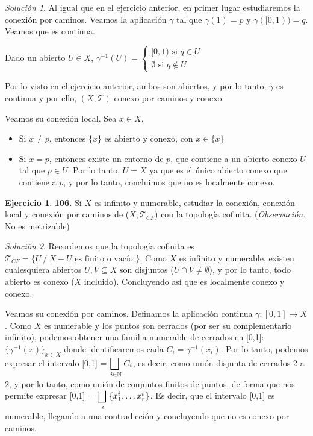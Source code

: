 \documentclass[12pt,twoside]{report}
\newcommand\mc[1]{\mathcal{#1}}
\theoremstyle{azul}
\theoremstyle{azul2}
\theoremstyle{plain}
\theoremstyle{definition}
\newtheorem*{ejern}{Ejercicio}
\theoremstyle{remark}
\newtheorem*{sol}{Solución}
\begin{document}
\begin{sol}
Al igual que en el ejercicio anterior, en primer lugar estudiaremos la conexión por caminos. Veamos la aplicación $\gamma$ tal que $\gamma(1)=p$ y $\gamma([0,1)) = q$. Veamos que es continua.

Dado un abierto $U \in X$, $\gamma^{-1}(U)=\left\{ \begin{array}{l}
     [ 0 , 1 )  \text{ si } q \in U  \\
     \emptyset  \text{ si } q \nin U
\end{array} \right.$

Por lo visto en el ejercicio anterior, ambos son abiertos, y por lo tanto, $\gamma$ es continua y por ello, $(X, \mc{T})$ conexo por caminos y conexo. 

Veamos su conexión local. Sea $x \in X$, \vspace{-5mm}
\begin{itemize}
    \item Si $x \neq p$, entonces $\{x\}$ es abierto y conexo, con $x \in \{x\}$
    \item Si $x = p$, entonces existe un entorno de $p$, que contiene a un abierto conexo $U$ tal que $p \in U$. Por lo tanto, $U=X$ ya que es el {\'u}nico abierto conexo que contiene a $p$, y por lo tanto, concluimos que no es localmente conexo. 
\end{itemize}
\end{sol} 
\begin{ejern} \textbf{106.}
 Si $X$ es infinito y numerable, estudiar la conexión, conexión local y conexión por caminos de ($X, \mc{T}_{CF}$) con la topología cofinita. (\textit{Observación.} No es metrizable)
\end{ejern}
\begin{sol}
Recordemos que la topología cofinita es $\mc{T}_{CF}=\{U\: / \: X-U \text{ es finito o vacío }\}$. Como $X$ es infinito y numerable, existen cualesquiera abiertos $U,V \subseteq X$ son disjuntos ($U \cap V \neq \emptyset$), y por lo tanto, todo abierto es conexo ($X$ incluido). Concluyendo así que es localmente conexo y conexo.

Veamos su conexión por caminos. Definamos la aplicación continua $\gamma: [0,1] \longrightarrow X$. Como $X$ es numerable y los puntos son cerrados (por ser su complementario infinito), podemos obtener una familia numerable de cerrados en [0,1]: $\Big\{ \gamma^{-1}(x) \Big\} _{x\in X}$ donde identificaremos cada $C_i = \gamma^{-1} (x_i)$. Por lo tanto, podemos expresar el intervalo [0,1] = $\underset{i \in \mathbb{N}}{\mathlarger{\bigsqcup \;}} \: C_i$, es decir, como unión disjunta de cerrados 2 a 2, y por lo tanto, como unión de conjuntos finitos de puntos, de forma que nos permite expresar [0,1] = $\underset{i}{\mathlarger{\bigsqcup \;}} \{x_1^i, \ldots x_r^i\}$. Es decir, que el intervalo [0,1] es numerable, llegando a una contradicción y concluyendo que no es conexo por caminos. 
\end{sol}
\;
\end{document}
